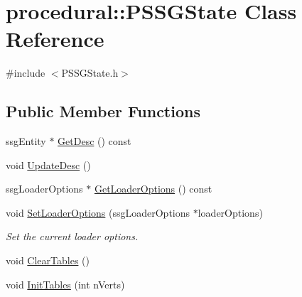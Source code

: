 \hypertarget{classprocedural_1_1_p_s_s_g_state}{\section{procedural\-:\-:P\-S\-S\-G\-State Class Reference}
\label{classprocedural_1_1_p_s_s_g_state}
}


{\ttfamily \#include $<$P\-S\-S\-G\-State.\-h$>$}

\subsection*{Public Member Functions}
\begin{DoxyCompactItemize}
\item 
ssg\-Entity $\ast$ \hyperlink{classprocedural_1_1_p_s_s_g_state_a52d02501acc9ff552a52cc2308a5168c}{Get\-Desc} () const 
\item 
void \hyperlink{classprocedural_1_1_p_s_s_g_state_aefb8b987e0bfaebd9138b248f7bd5d19}{Update\-Desc} ()
\item 
ssg\-Loader\-Options $\ast$ \hyperlink{classprocedural_1_1_p_s_s_g_state_a1d6a973b0ff92cef7729484ac22a62ba}{Get\-Loader\-Options} () const 
\item 
void \hyperlink{classprocedural_1_1_p_s_s_g_state_a4a990b66e80a9af47119904bf36486cc}{Set\-Loader\-Options} (ssg\-Loader\-Options $\ast$loader\-Options)
\begin{DoxyCompactList}\small\item\em Set the current loader options. \end{DoxyCompactList}\item 
void \hyperlink{classprocedural_1_1_p_s_s_g_state_a5f18d9f9ab072b38c14d0d15572ad59b}{Clear\-Tables} ()
\item 
void \hyperlink{classprocedural_1_1_p_s_s_g_state_a78497567ec685f8e77dc4a13b1638bd3}{Init\-Tables} (int n\-Verts)
\end{DoxyCompactItemize}

